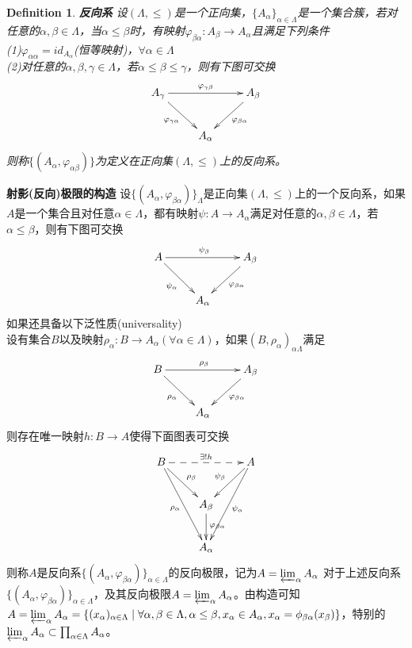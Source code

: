 \documentclass[UTF8]{article}
\newtheorem{defn}{Definition}[section]
\begin{document}
\begin{defn}
	\textbf{反向系}
	设$(\Lambda,\leq)$是一个正向集，$\{A_{\alpha}\}_{\alpha\in\Lambda}$是一个集合簇，若对任意的$\alpha,\beta\in\Lambda$，当$\alpha\leq\beta$时，有映射$\varphi_{\beta\alpha}:A_{\beta}\rightarrow A_{\alpha}$且满足下列条件\\
	(1)$\varphi_{\alpha\alpha}=id_{A_{\alpha}}$(恒等映射)，$\forall\alpha\in\Lambda$\\
	(2)对任意的$\alpha,\beta,\gamma\in\Lambda$，若$\alpha\leq\beta\leq\gamma$，则有下图可交换
	$$
	\xymatrix{
		A_{\gamma}\ar[rr]^{\varphi_{\gamma\beta}}\ar[rd]_{\varphi_{\gamma\alpha}}& &A_{\beta}\\
		&A_{\alpha}\ar@{<-}[ru]_{\varphi_{\beta\alpha}}&
	}
	$$
	则称$\{(A_{\alpha},\varphi_{\alpha\beta})\}$为定义在正向集$(\Lambda,\leq)$上的反向系。
\end{defn}
\textbf{射影(反向)极限的构造}
设$\{(A_{\alpha},\varphi_{\beta\alpha})\}_{\Lambda}$是正向集$(\Lambda,\leq)$上的一个反向系，如果$A$是一个集合且对任意$\alpha\in\Lambda$，都有映射$\psi:A\rightarrow A_{\alpha}$满足对任意的$\alpha,\beta\in\Lambda$，若$\alpha\leq\beta$，则有下图可交换
$$
\xymatrix{
	A\ar[rr]^{\psi_{\beta}}\ar[rd]_{\psi_{\alpha}}& &A_{\beta}\\
	&A_{\alpha}\ar@{<-}[ru]_{\varphi_{\beta\alpha}}&
}
$$
如果还具备以下泛性质(universality)\\
设有集合$B$以及映射$\rho_{\alpha}:B\rightarrow A_{\alpha}(\forall\alpha\in\Lambda)$，如果$(B,\rho_{\alpha})_{\alpha\Lambda}$满足
$$
\xymatrix{
	B\ar[rr]^{\rho_{\beta}}\ar[rd]_{\rho_{\alpha}}& &A_{\beta}\\
	&A_{\alpha}\ar@{<-}[ru]_{\varphi_{\beta\alpha}}&
}
$$
则存在唯一映射$h:B\rightarrow A$使得下面图表可交换
$$
\xymatrix{
	B\ar@{-->}[rr]^{\exists !h}\ar[rd]^{\rho_{\beta}}\ar[rdd]_{\rho_{\alpha}}& &A\ar[ld]_{\psi_{\beta}}\ar[ldd]^{\psi_{\alpha}}\\
	&A_{\beta}\ar[d]^{\varphi_{\beta\alpha}}&\\
	&A_{\alpha}&
}
$$
则称$A$是反向系$\{(A_{\alpha},\varphi_{\beta\alpha})\}_{\alpha\in\Lambda}$的反向极限，记为$A=\varprojlim_{\alpha}A_{\alpha}$
对于上述反向系$\{(A_{\alpha},\varphi_{\beta\alpha})\}_{\alpha\in\Lambda}$，及其反向极限$A=\varprojlim_{\alpha}A_{\alpha}$。由构造可知$A=\varprojlim_{\alpha}A_{\alpha}=\{(x_{\alpha})_{\alpha\in\Lambda}\mid\forall\alpha,\beta\in\Lambda,\alpha\leq\beta,x_{\alpha}\in A_{\alpha},x_{\alpha}=\phi_{\beta\alpha}(x_{\beta})\}$，特别的$\varprojlim_{\alpha}A_{\alpha}\subset\prod_{\alpha\in\Lambda}A_{\alpha}$。
\end{document}
